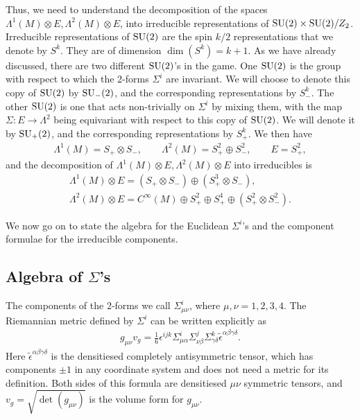 \documentclass[10pt]{report}
\theoremstyle{definition}
\begin{document}
Thus, we need to understand the decomposition of the spaces $\Lambda^1(M)\otimes E, \Lambda^2(M)\otimes E$, into irreducible representations of ${\rm SU}(2)\times{\rm SU}(2)/Z_2$. Irreducible representations of ${\rm SU}(2)$ are the spin $k/2$ representations that we denote by $S^k$. They are of dimension $\dim(S^k) = k+1$. As we have already discussed, there are two different ${\rm SU}(2)$'s in the game. One ${\rm SU}(2)$ is the group with respect to which the 2-forms $\Sigma^i$ are invariant. We will choose to denote this copy of ${\rm SU}(2)$ by ${\rm SU}_-(2)$, and the corresponding representations by $S^k_-$. The other ${\rm SU}(2)$ is one that acts non-trivially on $\Sigma^i$ by mixing them, with the map $\Sigma:E\to \Lambda^2$ being equivariant with respect to this copy of ${\rm SU}(2)$. We will denote it by ${\rm SU}_+(2)$, and the corresponding representations by $S_+^k$. We then have
\begin{align}
\Lambda^1(M) = S_+\otimes S_-, \qquad \Lambda^2(M) = S_+^2 \oplus S_-^2, \qquad E = S_+^2,
\end{align}
and the decomposition of $\Lambda^1(M)\otimes E, \Lambda^2(M)\otimes E$ into irreducibles is
\begin{align}\label{E-forms-decomp}
\Lambda^1(M) \otimes E= (S_+\otimes S_-) \oplus (S_+^3\otimes S_-), \\ \nonumber
\Lambda^2(M) \otimes E = C^\infty(M)  \oplus S_+^2 \oplus S_+^4 \oplus (S_+^2 \otimes S_-^2).
\end{align}

We now go on to state the algebra for the Euclidean $\Sigma^i$'s and the component formulae for the irreducible components.

\subsection{\texorpdfstring{Algebra of $\Sigma$'s}{}}

The components of the 2-forms we call $\Sigma^i_{\mu\nu}$, where $\mu,\nu =1,2,3,4$. The Riemannian metric defined by $\Sigma^i$ can be written explicitly as
\begin{align}\label{metric}
g_{\mu\nu} v_g = \frac{1}{6} \epsilon^{ijk} \Sigma^i_{\mu\alpha} \Sigma^j_{\nu\beta} \Sigma^k_{\gamma\delta} \tilde{\epsilon}^{\alpha\beta\gamma\delta}.
\end{align}
Here $\tilde{\epsilon}^{\alpha\beta\gamma\delta}$ is the densitiesed completely antisymmetric tensor, which has components $\pm 1$ in any coordinate system and does not need a metric for its definition. Both sides of this formula are densitiesed $\mu\nu$ symmetric tensors, and $v_g=\sqrt{\det(g_{\mu\nu})}$ is the volume form for $g_{\mu\nu}$. 
\end{document}
